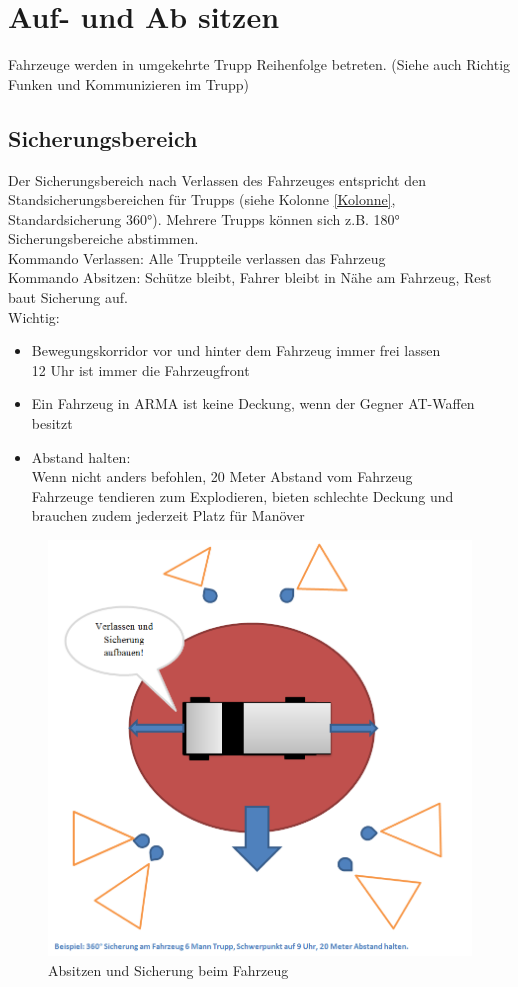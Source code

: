 \pagebreak
\section{Auf- und Ab sitzen}
	Fahrzeuge werden in umgekehrte Trupp Reihenfolge betreten. (Siehe auch \glqq Richtig Funken und Kommunizieren im Trupp\grqq)
	
\subsection{Sicherungsbereich}
	Der Sicherungsbereich nach Verlassen des Fahrzeuges entspricht den Standsicherungsbereichen für  Trupps (siehe Kolonne \autoref{Kolonne}, Standardsicherung 360°). Mehrere Trupps können sich z.B. 180° Sicherungsbereiche abstimmen. \\
	Kommando Verlassen:  Alle Truppteile verlassen das Fahrzeug \\
	Kommando Absitzen: Schütze bleibt, Fahrer bleibt in Nähe am Fahrzeug, Rest baut Sicherung auf.\\
	
	Wichtig:
	\begin{itemize}
		\item Bewegungskorridor vor und hinter dem Fahrzeug immer frei lassen\\ 12 Uhr ist immer die Fahrzeugfront
		\item Ein Fahrzeug in ARMA ist keine Deckung, wenn der Gegner AT-Waffen besitzt
		\item Abstand halten:\\ Wenn nicht anders befohlen, 20 Meter Abstand vom Fahrzeug\\ Fahrzeuge tendieren zum Explodieren, bieten schlechte Deckung und brauchen zudem jederzeit Platz für Manöver
	\end{itemize}
	\begin{figure}[htbp]
		\centering
		\includegraphics[width=15cm]{./img/grundlagen/umgangMitFahrzeugen/Fahrzeug_verlassen.png}
		\caption{Absitzen und Sicherung beim Fahrzeug}
	\end{figure}
